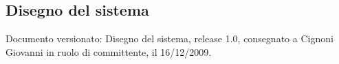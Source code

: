 \subsection{Disegno del sistema}
Documento versionato: Disegno del sistema, release 1.0, consegnato a Cignoni
Giovanni in ruolo di committente, il 16/12/2009.
